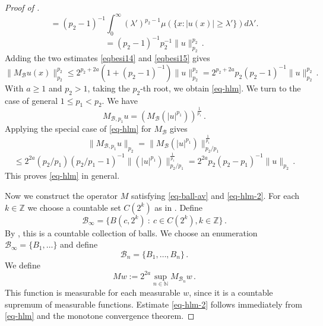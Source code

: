 \begin{proof}[Proof of ]
\begin{equation}
   =(p_2-1)^{-1}\int_0^\infty (\lambda')^{p_2-1}
     \mu (\{x: |u(x)|\ge \lambda'\})
d\lambda'.
\end{equation}
\begin{equation}\label{eqbesi15}
   =(p_2-1)^{-1} p_2^{-1}\|u\|_{p_2}^{p_2}\, .
\end{equation}
Adding the two estimates
\eqref{eqbesi14} and \eqref{eqbesi15} gives
\begin{equation}
    \|M_{\mathcal{B}}u(x)\|_{p_2}^{p_2}
   \le 2^{p_2+2a} (1+(p_2-1)^{-1})\|u\|_{p_2}^{p_2}
   = 2^{p_2+2a} p_2(p_2-1)^{-1}\|u\|_{p_2}^{p_2}
   \, .
   \end{equation}
With $a\ge 1$ and $p_2>1$, taking the $p_2$-th root, we obtain \eqref{eq-hlm}.
We turn to the case of general
$1\le p_1<p_2$.
We have
\begin{equation}
    M_{\mathcal{B},p_1}u=(M_{\mathcal{B}} (|u|^{p_1}))^{\frac 1{p_1}}\, .
\end{equation}
Applying the special case of \eqref{eq-hlm} for $M_{\mathcal{B}}$ gives
\begin{equation}
    \|M_{\mathcal{B},p_1}u\|_{p_2}=
    \|M_{\mathcal{B}} (|u|^{p_1})\|_{p_2/p_1}^{\frac 1{p_1}}
\end{equation}
\begin{equation}
    \le 2^{2a} (p_2/p_1) (p_2/p_1-1)^{-1}
    \|(|u|^{p_1})\|_{p_2/p_1}^{\frac 1{p_1}}
    =2^{2a} p_2(p_2-p_1)^{-1}\|u\|_{p_2}\, .
\end{equation}
This proves \eqref{eq-hlm} in general.

Now we construct the operator $M$ satisfying \eqref{eq-ball-av} and \eqref{eq-hlm-2}.
For each $k \in \mathbb{Z}$ we choose a countable set $C(2^k)$ as in .
Define
$$
    \mathcal{B}_\infty = \{B(c, 2^k) \ : \ c \in C(2^k), k \in \mathbb{Z}\}\,.
$$
By , this is a countable collection of balls. We choose an enumeration $\mathcal{B}_\infty = \{B_1, \dotsc\}$ and define
$$
    \mathcal{B}_n = \{B_1, \dotsc, B_n\}\,.
$$
We define
$$
    Mw := 2^{2a}\sup_{n \in \mathbb{N}} M_{\mathcal{B}_n}w\,.
$$
This function is measurable for each measurable $w$, since it is a countable supremum of measurable functions. Estimate \eqref{eq-hlm-2} follows immediately from \eqref{eq-hlm} and the monotone convergence theorem.


\end{proof}
